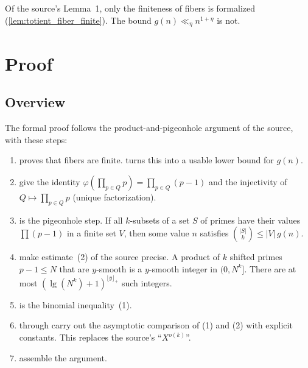 \documentclass[11pt]{article}
\theoremstyle{definition}
\theoremstyle{remark}
\newcommand{\nfl}[1]{\lfloor #1\rfloor_{+}}
\DeclareMathOperator{\lgt}{lg}
\begin{document}
Of the source's Lemma~1, only the finiteness of fibers is formalized (\cref{lem:totient_fiber_finite}). The bound $g(n)\ll_\eta n^{1+\eta}$ is not.

\section{Proof}

\subsection{Overview}

The formal proof follows the product-and-pigeonhole argument of the source, with these steps:
\begin{enumerate}
\item {} proves that fibers are finite.  turns this into a usable lower bound for $g(n)$.
\item {} give the identity $\varphi(\prod_{p\in Q}p)=\prod_{p\in Q}(p-1)$ and the injectivity of $Q\mapsto\prod_{p\in Q}p$ (unique factorization).
\item {} is the pigeonhole step. If all $k$-subsets of a set $S$ of primes have their values $\prod(p-1)$ in a finite set $V$, then some value $n$ satisfies $\binom{|S|}{k}\le|V|\,g(n)$.
\item {} make estimate~(2) of the source precise. A product of $k$ shifted primes $p-1\le N$ that are $y$-smooth is a $y$-smooth integer in $(0,N^k]$. There are at most $(\lgt(N^k)+1)^{\nfl{y}}$ such integers.
\item {} is the binomial inequality~(1).
\item {} through  carry out the asymptotic comparison of (1) and (2) with explicit constants. This replaces the source's ``$X^{o(k)}$''.
\item {} assemble the argument.
\end{enumerate}
\end{document}
